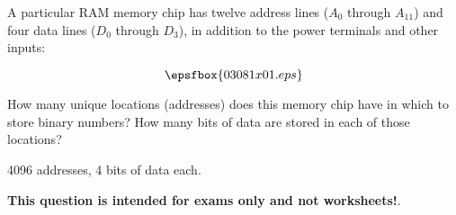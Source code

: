 

A particular RAM memory chip has twelve address lines ($A_0$ through $A_{11}$) and four data lines ($D_0$ through $D_3$), in addition to the power terminals and other inputs:

$$\epsfbox{03081x01.eps}$$

How many unique locations (addresses) does this memory chip have in which to store binary numbers?  How many bits of data are stored in each of those locations?







4096 addresses, 4 bits of data each.







{\bf This question is intended for exams only and not worksheets!}.





